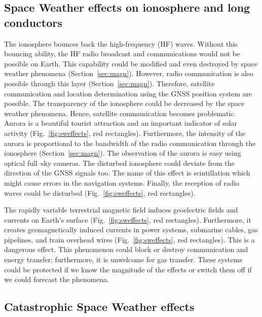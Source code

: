 \documentclass[sn-aps]{sn-jnl}%
\begin{document}
\subsection{Space Weather effects on ionosphere and long conductors}
\label{sec:swgeneral}

The ionosphere bounces back the high-frequency (HF) waves. Without this bouncing ability, the HF radio broadcast and communications would not be possible on Earth. This capability could be modified and even destroyed by space weather phenomena (Section~\ref{sec:magn}). However, radio communication is also possible through this layer (Section~\ref{sec:magn}). Therefore, satellite communication and location determination using the GNSS position system are possible. The transparency of the ionosphere could be decreased by the space weather phenomena. Hence, satellite communication becomes problematic. Aurora is a beautiful tourist attraction and an important indicator of solar activity (Fig.~\ref{fig:sweffects}, red rectangles). Furthermore, the intensity of the aurora is proportional to the bandwidth of the radio communication through the ionosphere (Section~\ref{sec:magn}). The observation of the aurora is easy using optical full--sky cameras. The disturbed ionosphere could deviate from the direction of the GNSS signals too. The name of this effect is scintillation which might cause errors in the navigation systems. Finally, the reception of radio waves could be disturbed (Fig.~\ref{fig:sweffects}, red rectangles).

The rapidly variable terrestrial magnetic field induces geoelectric fields and currents on Earth's surface (Fig.~\ref{fig:sweffects}, red rectangles). Furthermore, it creates geomagnetically induced currents in power systems, submarine cables, gas pipelines, and train overhead wires (Fig.~\ref{fig:sweffects}, red rectangles). This is a dangerous effect. This phenomenon could block or destroy communication and energy transfer; furthermore, it is unwelcome for gas transfer. These systems could be protected if we know the magnitude of the effects or switch them off if we could forecast the phenomena. 

\subsection{Catastrophic Space Weather effects}
\label{sec:swcata}
\end{document}
